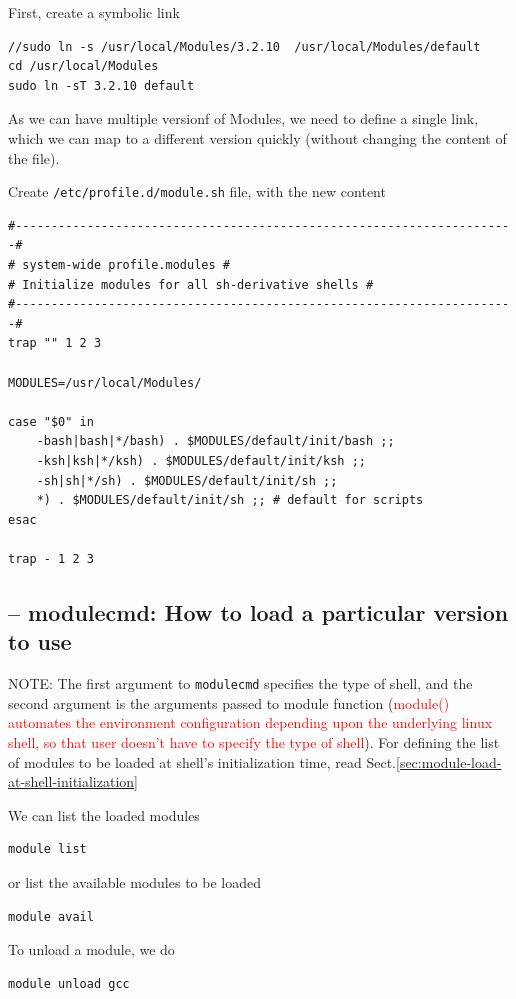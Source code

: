 First, create a symbolic link
\begin{verbatim}
//sudo ln -s /usr/local/Modules/3.2.10  /usr/local/Modules/default
cd /usr/local/Modules
sudo ln -sT 3.2.10 default
\end{verbatim}
As we can have multiple versionf of Modules, we need to define a single link,
which we can map to a different version quickly (without changing the content
of the file).

Create \verb!/etc/profile.d/module.sh! file, with the new content
\begin{verbatim}
#----------------------------------------------------------------------#
# system-wide profile.modules #
# Initialize modules for all sh-derivative shells #
#----------------------------------------------------------------------#
trap "" 1 2 3
 
MODULES=/usr/local/Modules/
 
case "$0" in
    -bash|bash|*/bash) . $MODULES/default/init/bash ;;
    -ksh|ksh|*/ksh) . $MODULES/default/init/ksh ;;
    -sh|sh|*/sh) . $MODULES/default/init/sh ;;
    *) . $MODULES/default/init/sh ;; # default for scripts
esac
 
trap - 1 2 3
\end{verbatim}



\subsection{-- modulecmd: How to load a particular version to use}
\label{sec:Modules-load-package}
\label{sec:Modules-modulecmd}

NOTE:  The first argument to \verb!modulecmd! specifies the type of shell, and
the second argument is the arguments passed to module function
(\textcolor{red}{module() automates the environment configuration depending
upon the underlying linux shell, so that user doesn't have to specify the
type of shell}).
For defining the list of modules to be loaded at shell's initialization time,
read Sect.\ref{sec:module-load-at-shell-initialization}

We can list the loaded modules
\begin{verbatim}
module list
\end{verbatim}

or list the available modules to be loaded
\begin{verbatim}
module avail
\end{verbatim}

To unload a module, we do
\begin{verbatim}
module unload gcc
\end{verbatim}


